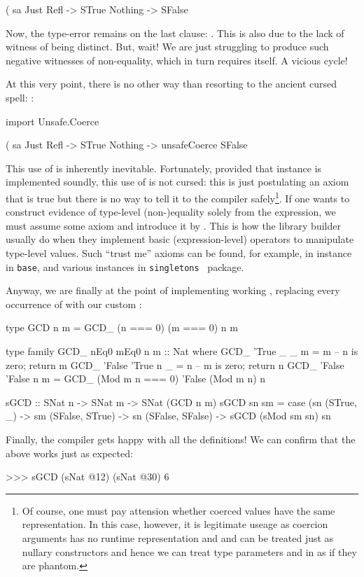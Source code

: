 \documentclass[demotion-paper.tex]{subfiles}
\begin{document}
\begin{code}
(%
sa %
  Just Refl -> STrue
  Nothing -> SFalse  
\end{code}

Now, the type-error remains on the last clause: .
This is also due to the lack of witness of being distinct.
But, wait! We are just struggling to produce such negative witnesses of non-equality, which in turn requires itself. A vicious cycle!

At this very point, there is no other way than resorting to the ancient cursed spell: :

\begin{code}
import Unsafe.Coerce

(%
sa %
  Just Refl -> STrue
  Nothing -> unsafeCoerce SFalse  
\end{code}

This use of  is inherently inevitable.
Fortunately, provided that  instance is implemented soundly, this use of  is not cursed: this is just postulating an axiom that is true but there is no way to tell it to the compiler safely\footnote{Of course, one must pay attension whether coerced values have the same representation. In this case, however, it is legitimate useage as coercion arguments has no runtime representation and {} and {} can be treated just as nullary constructors and hence we can treat type parameters {} and {} in {} as if they are phantom.}.
If one wants to construct evidence of type-level (non-)equality solely from the expression, we must assume some axiom and introduce it by .
This is how the library builder usually do when they implement basic (expression-level) operators to manipulate type-level values.
Such ``trust me'' axioms can be found, for example, in  instance in \texttt{base}, and various  instances in \texttt{singletons}~\cite{singletons} package.

Anyway, we are finally at the point of implementing working , replacing every occurrence of \hask{(==)} with our custom \hask{(===)}:

\begin{code}
type GCD n m = GCD_ (n === 0) (m === 0) n m

type family GCD_ nEq0 mEq0 n m :: Nat where
  GCD_ 'True  _      _ m = m -- n is zero; return m
  GCD_ 'False 'True  n _ = n -- m is zero; return n
  GCD_ 'False 'False n m = GCD_ (Mod m n === 0) 'False (Mod m n) n

sGCD :: SNat n -> SNat m -> SNat (GCD n m)
sGCD sn sm = case (sn %
  (STrue, _) -> sm
  (SFalse, STrue) -> sn
  (SFalse, SFalse) -> sGCD (sMod sm sn) sn
\end{code}

Finally, the compiler gets happy with all the definitions!
We can confirm that the above  works just as expected:
\begin{repl}
>>> sGCD (sNat @12) (sNat @30)
6
\end{repl}
\end{document}
